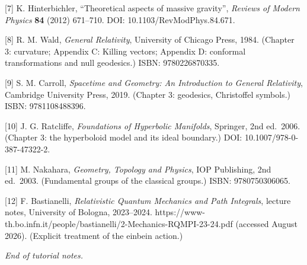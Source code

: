 \documentclass[
]{article}
\begin{document}
{[}7{]} K. Hinterbichler, ``Theoretical aspects of massive gravity'',
\emph{Reviews of Modern Physics} \textbf{84} (2012) 671--710. DOI:
10.1103/RevModPhys.84.671.

{[}8{]} R. M. Wald, \emph{General Relativity}, University of Chicago
Press, 1984. (Chapter 3: curvature; Appendix C: Killing vectors;
Appendix D: conformal transformations and null geodesics.) ISBN:
9780226870335.

{[}9{]} S. M. Carroll, \emph{Spacetime and Geometry: An Introduction to
General Relativity}, Cambridge University Press, 2019. (Chapter 3:
geodesics, Christoffel symbols.) ISBN: 9781108488396.

{[}10{]} J. G. Ratcliffe, \emph{Foundations of Hyperbolic Manifolds},
Springer, 2nd ed.~2006. (Chapter 3: the hyperboloid model and its ideal
boundary.) DOI: 10.1007/978-0-387-47322-2.

{[}11{]} M. Nakahara, \emph{Geometry, Topology and Physics}, IOP
Publishing, 2nd ed.~2003. (Fundamental groups of the classical groups.)
ISBN: 9780750306065.

{[}12{]} F. Bastianelli, \emph{Relativistic Quantum Mechanics and Path
Integrals}, lecture notes, University of Bologna, 2023--2024.
https://www-th.bo.infn.it/people/bastianelli/2-Mechanics-RQMPI-23-24.pdf
(accessed August 2026). (Explicit treatment of the einbein action.)

\emph{End of tutorial notes.}
\end{document}
